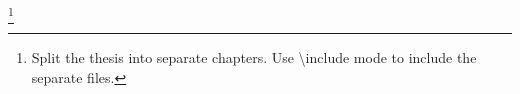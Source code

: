 \documentclass{report}
\makeatletter
\providecommand{\printnomenclature}{\printglossary}
\providecommand{\LyX}{L\kern-.1667em\lower.25em\hbox{Y}\kern-.125emX\@}
\makeatother
\begin{document}
\prelimpages

\titlepage






\tableofcontents{}
\footnote{Split the thesis into separate chapters. Use \textbackslash{}include
mode to include the separate files.}


\textpages

\listoffigures


\listoftables


\printnomenclature{}









\appendix


\newpage{}

\begin{comment}
It is possible to create the Hebrew part in \LyX{}, but this is less
of our concern. Any typesetting software like \LyX{} (or Word or OpenOffice)
is as good for this purpose. After creating the PDF file from the
Hebrew document, include it here using the Insert -> File -> External
material -> PDFpages (one of the options). See the example below. 
\end{comment}



\end{document}
